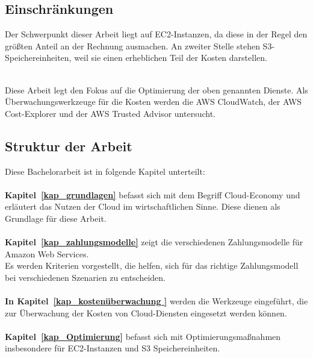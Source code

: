 
\subsection*{Einschränkungen}

Der Schwerpunkt dieser Arbeit liegt auf EC2-Instanzen, da diese in der Regel den größten Anteil an der Rechnung ausmachen.
An zweiter Stelle stehen S3-Speichereinheiten, weil sie einen erheblichen Teil der Kosten darstellen.

{\cite{AMZ08,AMZ09}} 
\\
Diese Arbeit legt den Fokus auf die Optimierung der oben genannten Dienste.
Als Überwachungswerkzeuge für die Kosten werden die AWS CloudWatch, der AWS Cost-Explorer und der AWS Trusted Advisor untersucht. 

\subsection*{Struktur der Arbeit}


Diese Bachelorarbeit ist in folgende Kapitel unterteilt:\\\\
\textbf{Kapitel~\ref{kap_grundlagen}} 
befasst sich mit dem Begriff Cloud-Economy und erläutert das Nutzen der Cloud im wirtschaftlichen Sinne. Diese dienen als Grundlage für diese Arbeit. \\\\
\textbf{Kapitel~\ref{kap_zahlungsmodelle}} 
zeigt die verschiedenen Zahlungsmodelle für Amazon Web Services. 
\\
Es werden Kriterien vorgestellt, die helfen, sich für das richtige Zahlungsmodell bei verschiedenen Szenarien zu entscheiden. 
\\\\
\textbf{In Kapitel~\ref{kap_kostenüberwachung }} werden die Werkzeuge eingeführt, die zur Überwachung der Kosten von Cloud-Diensten eingesetzt werden können.
\\\\
\textbf{Kapitel~\ref{kap_Optimierung}} befasst sich mit Optimierungsmaßnahmen insbesondere für EC2-Instanzen und S3 Speichereinheiten.

